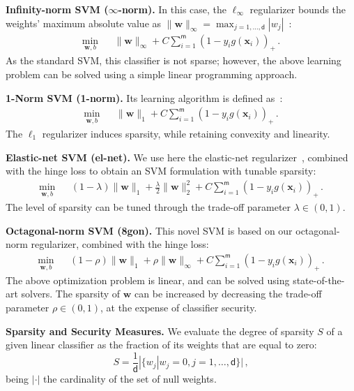 \documentclass[runningheads,a4paper]{llncs}
\newcommand{\vct}[1]{\ensuremath{\boldsymbol{#1}}}
\newcommand{\con}[1]{\ensuremath{\mathsf{#1}}}
\newcommand{\myparagraph}[1]{\smallskip \noindent \textbf{#1.}}
\begin{document}
\myparagraph{Infinity-norm SVM ($\infty$-norm)} In this case, the $\ell_{\infty}$ regularizer bounds the weights' maximum absolute value as $\| \vct w \|_{\infty} = \max_{j=1,\ldots,\con d} |w_{j}|$~\cite{bondell08}:
%
\begin{eqnarray}
 \min_{\vct w,b} && \| \vct w \|_{\infty} + C \sum_{i=1}^{\con m} \left( 1 - y_{i} g(\vct x_{i}) \right)_{+} \, .
\end{eqnarray}
As the standard SVM, this classifier is not sparse; however, the above learning problem can be solved using a simple linear programming approach.

\myparagraph{1-Norm SVM (1-norm)} Its learning algorithm is defined as~\cite{zhu04-nips}:
%
\begin{eqnarray}
\label{eq:1-norm}
 \min_{\vct w,b} && \| \vct w \|_{1} + C \sum_{i=1}^{\con m} \left( 1 - y_{i} g(\vct x_{i}) \right)_{+} \, .
\end{eqnarray}
The $\ell_{1}$ regularizer induces sparsity, while retaining convexity and linearity.


\myparagraph{Elastic-net SVM (el-net)} We use here the elastic-net regularizer~\cite{zou05-elasticnet}, combined with the hinge loss to obtain an SVM formulation with tunable sparsity:
%
\begin{eqnarray}
 \min_{\vct w,b} &&  (1-\lambda) \| \vct w \|_{1} + \frac{\lambda}{2} \| \vct w \|^2_{2} + C \sum_{i=1}^{\con m} \left( 1 - y_{i} g(\vct x_{i}) \right)_{+} \, .
\end{eqnarray}
%
The level of sparsity can be tuned through the trade-off parameter $\lambda \in (0,1)$.

\myparagraph{Octagonal-norm SVM (8gon)}   This novel SVM is based on our octagonal-norm regularizer, combined with the hinge loss: 
 \begin{eqnarray}
  \min_{\vct w,b} &&  (1-\rho) \| \vct w \|_{1} + \rho \| \vct w \|_{\infty}  + C \sum_{i=1}^{\con m} \left( 1 - y_{i} g(\vct x_{i}) \right)_{+} \, .
 \end{eqnarray}
The above optimization problem is linear, and can be solved using state-of-the-art solvers. The sparsity of $\vct w$ can be increased by decreasing the trade-off parameter $\rho \in (0,1)$, at the expense of classifier security.



\myparagraph{Sparsity and Security Measures} We evaluate the degree of sparsity $S$ of a given linear classifier as the fraction of its weights that are equal to zero:
\begin{equation}
\label{eq:S}
S = \frac{1}{\con d} |  \{ w_{j} | w_{j} = 0, j=1,\ldots,\con d  \}  | \, ,
\end{equation}
being $| \cdot |$ the cardinality of the set of null weights.
\end{document}
